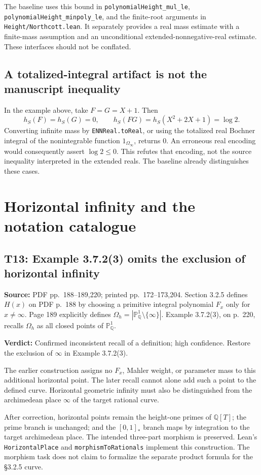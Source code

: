 \documentclass[11pt,a4paper]{article}
\newcommand{\Q}{\mathbb Q}
\newcommand{\PP}{\mathbb P}
\newcommand{\code}[1]{{\small\nolinkurl{#1}}}
\newcommand{\loc}[2]{\par\noindent\textbf{Source:} PDF pp.~#1; printed pp.~#2.}
\newcommand{\verdict}[1]{\par\noindent\textbf{Verdict:} #1\par}
\begin{document}
The baseline uses this bound in \code{polynomialHeight_mul_le},
\code{polynomialHeight_minpoly_le}, and the finite-root arguments in
\code{Height/Northcott.lean}. It separately provides a real mass estimate with a finite-mass assumption and an unconditional extended-nonnegative-real estimate. These interfaces should not be conflated.

\subsection{A totalized-integral artifact is not the manuscript inequality}
In the example above, take $F=G=X+1$. Then
\[
 h_S(F)=h_S(G)=0,\qquad h_S(FG)=h_S(X^2+2X+1)=\log2.
\]
Converting infinite mass by \code{ENNReal.toReal}, or using the totalized real Bochner integral of the nonintegrable function $1_{\Omega_\infty}$, returns 0. An erroneous real encoding would consequently assert $\log2\le0$. This refutes that encoding, not the source inequality interpreted in the extended reals. The baseline already distinguishes these cases.


\clearpage
\section{Horizontal infinity and the notation catalogue}\label{horizontal}
\subsection{T13: Example 3.7.2(3) omits the exclusion of horizontal infinity}
\loc{188--189,220}{172--173,204}
Section 3.2.5 defines $H(x)$ on PDF p.~188 by choosing a primitive integral polynomial $F_x$ only for $x\ne\infty$. Page 189 explicitly defines
$\Omega_h=|\PP^1_\Q\setminus\{\infty\}|$.
Example 3.7.2(3), on p.~220, recalls $\Omega_h$ as all closed points of $\PP^1_\Q$.
\verdict{Confirmed inconsistent recall of a definition; high confidence. Restore the exclusion of $\infty$ in Example 3.7.2(3).}

The earlier construction assigns no $F_x$, Mahler weight, or parameter mass to this additional horizontal point. The later recall cannot alone add such a point to the defined curve. Horizontal geometric infinity must also be distinguished from the archimedean place $\infty$ of the target rational curve.

After correction, horizontal points remain the height-one primes of $\Q[T]$; the prime branch is unchanged; and the $[0,1]_*$ branch maps by integration to the target archimedean place. The intended three-part morphism is preserved. Lean's \code{HorizontalPlace} and \code{morphismToRationals} implement this construction. The morphism task does not claim to formalize the separate product formula for the \S3.2.5 curve.
\end{document}
